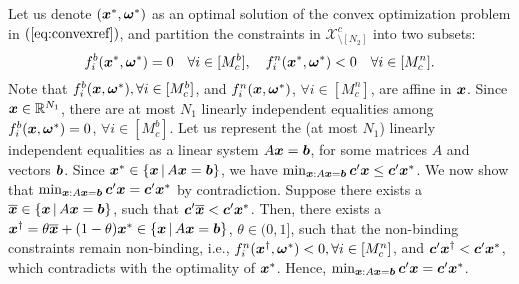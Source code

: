 \documentclass[fleqn,isre,blindrev]{informs4}
\newcommand{\mb}[1]{\mbox{\boldmath \ensuremath{#1}}}
\begin{document}
\begin{appendices}
{    Let us denote $(\mb{x}^*,\mb{\omega}^*)$ as an optimal solution of the convex optimization problem in $(\ref{eq:convexref})$, and partition the constraints in $\mathcal{X}^{c}_{\setminus [N_2]}$ into two subsets: 
\begin{equation*}
	f_i^b(\mb{x}^*,\mb{\omega}^*) = 0  \quad \forall i\in [M^b_c], \quad f_i^n(\mb{x}^*,\mb{\omega}^*) <0  \quad \forall i\in [M^n_c].
\end{equation*}
	Note that $f_i^b(\mb{x},\mb{\omega}^*), \forall i\in [M^b_c]$, and $f_i^n(\mb{x},\mb{\omega}^*)$,  $\forall i\in [M^n_c]$,  are affine in $\mb{x}$. Since $\mb{x} \in \mathbb{R}^{N_1}$, there are at most $N_1$ linearly independent equalities among $f_i^b(\mb{x},\mb{\omega}^*) = 0$, $\forall i\in [M^b_c]$.  Let us represent the (at most $N_1$) linearly independent equalities as a linear system $A\mb{x} = \mb{b}$, for some matrices $A$ and vectors $\mb{b}$. Since $\mb{x}^* \in \left\{ \mb{x} \,| \, A\mb{x} = \mb{b} \right\}$,  we have $\min_{\boldsymbol{x} : A\boldsymbol{x} = \boldsymbol{b} } \mb{c}'\mb{x} \le \mb{c}'\mb{x}^*$. We now show that $\min_{\boldsymbol{x} : A\boldsymbol{x} = \boldsymbol{b} } \mb{c}'\mb{x} = \mb{c}'\mb{x}^*$ by contradiction.	Suppose there exists a $\overline{\mb{x}} \in \left\{ \mb{x} \,| \, A\mb{x} = \mb{b} \right\}$, such that $\mb{c}'\overline{\mb{x}} < \mb{c}'\mb{x}^*$. Then, there exists a $\mb{x}^{\dagger} = \theta \overline{\mb{x}} +(1- \theta)\mb{x}^* \in \left\{ \mb{x} \,| \, A\mb{x} = \mb{b} \right\}$, $\theta\in (0,1]$, such that the non-binding constraints remain non-binding, i.e., $f_i^n(\mb{x}^{\dagger},\mb{\omega}^*) <0 , \forall i\in [M^n_c]$, and $ \mb{c}'\mb{x}^{\dagger} < \mb{c}'\mb{x}^*$, which contradicts with the optimality of $\mb{x}^*$.  Hence, $\min_{\boldsymbol{x} : A\boldsymbol{x} = \boldsymbol{b} } \mb{c}'\mb{x} = \mb{c}'\mb{x}^*$. 
	
}
\end{appendices}
\end{document}
